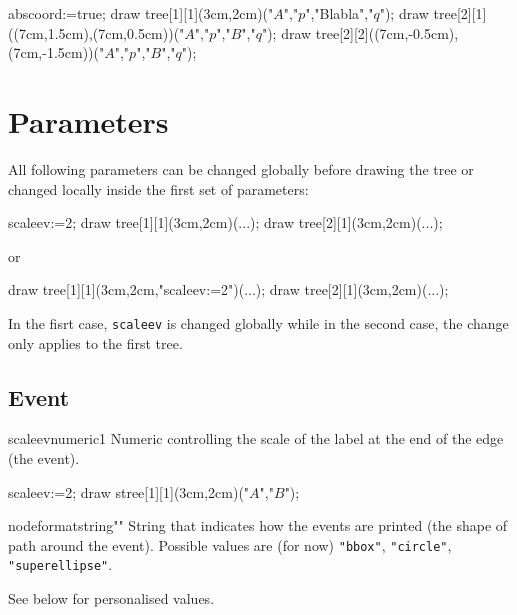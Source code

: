 \documentclass[11pt,a4paper,english]{article}
\begin{document}

\begin{exemple}
abscoord:=true;
draw tree[1][1](3cm,2cm)("$A$","$p$","Blabla","$q$");
draw tree[2][1]((7cm,1.5cm),(7cm,0.5cm))("$A$","$p$","$B$","$q$");
draw tree[2][2]((7cm,-0.5cm),(7cm,-1.5cm))("$A$","$p$","$B$","$q$");
\end{exemple}


\section{Parameters}

All following parameters can be changed globally before drawing the tree or changed locally inside the first set of parameters:

\begin{codempost}[width=0.7\linewidth,left skip=1cm]
scaleev:=2;
draw tree[1][1](3cm,2cm)(...);
draw tree[2][1](3cm,2cm)(...);
\end{codempost}

or

\begin{codempost}[width=0.7\linewidth,left skip=1cm]
draw tree[1][1](3cm,2cm,"scaleev:=2")(...);
draw tree[2][1](3cm,2cm)(...);
\end{codempost}

In the fisrt case, \verb|scaleev| is changed globally while in the second case, the change only applies to the first tree.


\subsection{Event}

\begin{mptparam}{scaleev}{numeric}{1}
Numeric controlling the scale of the label at the end of the edge (the event).
\end{mptparam}


\begin{exemple}[lefthand ratio=0.65]
 scaleev:=2;
 draw stree[1][1](3cm,2cm)("$A$","$B$");
\end{exemple}

\begin{mptparam}{nodeformat}{string}{""}
String that indicates how the events are printed (the shape of path around the event). Possible values are (for now) \verb|"bbox"|, \verb|"circle"|, \verb|"superellipse"|.

See below for personalised values.
\end{mptparam}
\end{document}
